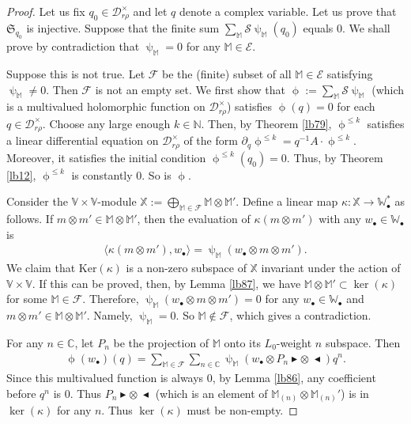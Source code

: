 \documentclass[12pt,a4paper,notitlepage]{report}
\theoremstyle{definition}
\theoremstyle{plain}
\newcommand{\fk}{\mathfrak}
\newcommand{\mc}{\mathcal}
\newcommand{\bk}[1]{\langle {#1}\rangle}
\newcommand{\mbb}{\mathbb}
\newcommand{\blt}{\bullet}
\newcommand{\Vbb}{\mathbb V}
\newcommand{\Wbb}{\mathbb W}
\newcommand{\Mbb}{\mathbb M}
\newcommand{\Cbb}{\mathbb C}
\newcommand{\Nbb}{\mathbb N}
\newcommand{\btl}{\blacktriangleleft}
\newcommand{\btr}{\blacktriangleright}
\newcommand{\Ker}{\mathrm{Ker}}
\numberwithin{equation}{section}
\begin{document}
\begin{proof}
Let us fix $q_0\in\mc D_{r\rho}^\times$ and let $q$ denote a complex variable. Let us prove that $\fk S_{q_0}$ is injective. Suppose that the finite sum $\sum_\Mbb\mc S\uppsi_\Mbb(q_0)$ equals $0$. We shall prove by contradiction that $\uppsi_\Mbb=0$ for any $\Mbb\in\mc E$. 

Suppose this is not true. Let $\mc F$ be the (finite) subset of all $\Mbb\in\mc E$ satisfying $\uppsi_\Mbb\neq0$. Then $\mc F$ is not an empty set. We first show that $\upphi:=\sum_\Mbb\mc S\uppsi_\Mbb$ (which is a multivalued holomorphic function on $\mc D_{r\rho}^\times$) satisfies $\upphi(q)=0$ for each $q\in\mc D_{r\rho}^\times$. Choose any large enough  $k\in\Nbb$. Then, by Theorem \ref{lb79},  $\upphi^{\leq k}$ satisfies a linear differential equation on $\mc D_{r\rho}^\times$ of the form $\partial_q\upphi^{\leq k}=q^{-1}A\cdot \upphi^{\leq k}$. Moreover, it satisfies the initial condition $\upphi^{\leq k}(q_0)=0$. Thus, by Theorem \ref{lb12}, $\upphi^{\leq k}$ is constantly $0$. So is $\upphi$.

Consider the $\Vbb\times\Vbb$-module $\mbb X:=\bigoplus_{\Mbb\in\mc F}\Mbb\otimes\Mbb'$. Define a linear map $\kappa:\mbb X\rightarrow \Wbb_\blt^*$ as follows. If $m\otimes m'\in\Mbb\otimes\Mbb'$, then the evaluation of $\kappa(m\otimes m')$ with any $w_\blt\in\Wbb_\blt$ is
\begin{align*}
\bk{\kappa(m\otimes m'),w_\blt}=\uppsi_\Mbb(w_\blt\otimes m\otimes m').
\end{align*}
We claim that $\Ker(\kappa)$ is a non-zero subspace of $\mbb X$ invariant under the action of $\Vbb\times \Vbb$. If this can be proved, then, by Lemma \ref{lb87}, we have $\Mbb\otimes\Mbb'\subset \ker(\kappa)$ for some $\Mbb\in\mc F$. Therefore, $\uppsi_\Mbb(w_\blt\otimes m\otimes m')=0$ for any $w_\blt\in\Wbb_\blt$ and $m\otimes m'\in\Mbb\otimes\Mbb'$. Namely, $\uppsi_\Mbb=0$. So $\Mbb\notin\mc F$, which gives a contradiction. 

For any $n\in\Cbb$, let $P_n$ be the projection of $\Mbb$ onto its $L_0$-weight $n$ subspace. Then 
\begin{align*}
\upphi(w_\blt)(q)=\sum_{\Mbb\in\mc F}\sum_{n\in\Cbb} \uppsi_\Mbb(w_\blt\otimes P_n\btr\otimes~\btl)q^n.
\end{align*}
Since this multivalued function is always $0$, by Lemma \ref{lb86}, any coefficient before $q^n$ is $0$. Thus $P_n\btr\otimes~\btl$ (which is an element of $\Mbb_{(n)}\otimes\Mbb_{(n)}'$) is in $\ker(\kappa)$ for any $n$. Thus $\ker(\kappa)$ must be non-empty.


\end{proof}
\end{document}
